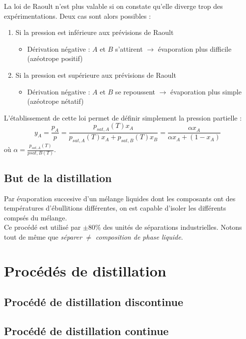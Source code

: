 \documentclass[11pt, a4paper, openany]{book}
\begin{document}
	La loi de Raoult n'est plus valable si on constate qu'elle diverge trop des 
	expérimentations. Deux cas sont alors possibles :
	\begin{enumerate}
	\item Si la pression est inférieure aux prévisions de Raoult
		\begin{itemize}
		\item Dérivation négative : $A$ et $B$ s'attirent $\rightarrow$ évaporation plus
		difficile (azéotrope positif)
		\end{itemize}
	\item Si la pression est supérieure aux prévisions de Raoult
		\begin{itemize}
		\item Dérivation négative : $A$ et $B$ se repoussent $\rightarrow$ évaporation plus
		simple (azéotrope nétatif)
		\end{itemize}
	\end{enumerate}
	
	L'établissement de cette loi permet de définir simplement la pression partielle :
	\begin{equation}
	y_A = \frac{p_A}{p} = \frac{p_{sat,A}(T)x_A}{p_{sat,A}(T)x_A+p_{sat,B}(T)x_B} = \frac{
	\alpha x_A}{\alpha x_A +(1-x_A)}
	\end{equation}
	où $\alpha = \frac{p_{sat,A}(T)}{p{sat,B}(T)}$.
	
	\subsection{But de la distillation}
	Par évaporation succesive d'un mélange liquides dont les composants ont des températures
	d'ébullitions différentes, on est capable d'isoler les différents compsés du mélange.\\
	Ce procédé est utilisé par $\pm 80\%$ des unités de séparations industrielles. Notons 
	tout de même que \textit{séparer} $\neq$ \textit{composition de phase liquide}.
	
	

\section{Procédés de distillation}
	\subsection{Procédé de distillation discontinue}
	\subsection{Procédé de distillation continue}
	
\end{document}
